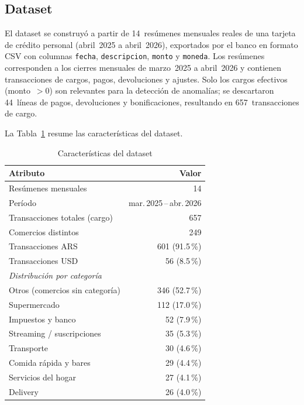 \documentclass[conference]{IEEEtran}
\begin{document}
\subsection{Dataset}

El dataset se construy\'o a partir de 14~res\'umenes mensuales reales de una tarjeta
de cr\'edito personal (abril~2025 a abril~2026), exportados por el banco en formato
CSV con columnas \texttt{fecha}, \texttt{descripcion}, \texttt{monto} y
\texttt{moneda}. Los res\'umenes corresponden a los cierres mensuales de marzo~2025
a abril~2026 y contienen transacciones de cargos, pagos, devoluciones y ajustes.
Solo los cargos efectivos (monto~$> 0$) son relevantes para la detecci\'on de
anomal\'ias; se descartaron 44~l\'ineas de pagos, devoluciones y bonificaciones,
resultando en 657~transacciones de cargo.

La Tabla~\ref{tab:dataset-stats} resume las caracter\'isticas del dataset.

\begin{table}[h]
\caption{Caracter\'isticas del dataset}
\label{tab:dataset-stats}
\centering
\begin{tabular}{lr}
\toprule
\textbf{Atributo} & \textbf{Valor} \\
\midrule
Res\'umenes mensuales & 14 \\
Per\'iodo            & mar.\,2025\,--\,abr.\,2026 \\
Transacciones totales (cargo) & 657 \\
Comercios distintos  & 249 \\
Transacciones ARS    & 601 (91.5\,\%) \\
Transacciones USD    & 56 (8.5\,\%) \\
\midrule
\multicolumn{2}{l}{\textit{Distribuci\'on por categor\'ia}} \\
Otros (comercios sin categor\'ia) & 346 (52.7\,\%) \\
Supermercado        & 112 (17.0\,\%) \\
Impuestos y banco   & 52 (7.9\,\%) \\
Streaming / suscripciones & 35 (5.3\,\%) \\
Transporte          & 30 (4.6\,\%) \\
Comida r\'apida y bares & 29 (4.4\,\%) \\
Servicios del hogar & 27 (4.1\,\%) \\
Delivery            & 26 (4.0\,\%) \\
\bottomrule
\end{tabular}
\end{table}
\end{document}
